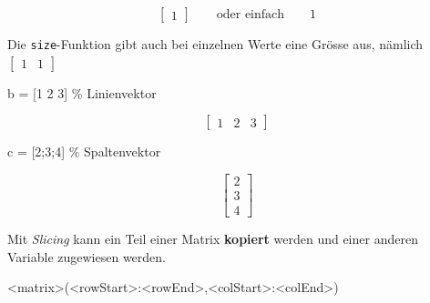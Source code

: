 \documentclass[
  10pt,
  a4paper,
]{article}
\newenvironment{Shaded}{}{}
\newcommand{\CommentTok}[1]{\textcolor[rgb]{0.42,0.45,0.49}{#1}}
\newcommand{\FloatTok}[1]{\textcolor[rgb]{0.00,0.36,0.77}{#1}}
\newcommand{\NormalTok}[1]{\textcolor[rgb]{0.14,0.16,0.18}{#1}}
\newcommand{\OperatorTok}[1]{\textcolor[rgb]{0.14,0.16,0.18}{#1}}
\newcommand{\VariableTok}[1]{\textcolor[rgb]{0.89,0.38,0.04}{#1}}
\numberwithin{equation}{section}
\begin{document}
\begin{multicols}{2}
\[
\begin{bmatrix}
1
\end{bmatrix}\qquad \text{oder einfach}\qquad 1 
\]

Die \texttt{size}-Funktion gibt auch bei einzelnen Werte eine Grösse
aus, nämlich \(\begin{bmatrix}1 & 1\end{bmatrix}\)

\begin{Shaded}
\begin{Highlighting}[]
\VariableTok{b} \OperatorTok{=}\NormalTok{ [}\FloatTok{1} \FloatTok{2} \FloatTok{3}\NormalTok{] }\CommentTok{\% Linienvektor}
\end{Highlighting}
\end{Shaded}

\[
\begin{bmatrix}
1 & 2 & 3
\end{bmatrix}
\]

\begin{Shaded}
\begin{Highlighting}[]
\VariableTok{c} \OperatorTok{=}\NormalTok{ [}\FloatTok{2}\OperatorTok{;}\FloatTok{3}\OperatorTok{;}\FloatTok{4}\NormalTok{] }\CommentTok{\% Spaltenvektor}
\end{Highlighting}
\end{Shaded}

\[
\begin{bmatrix}
2 \\ 3 \\ 4
\end{bmatrix}
\]

\begin{tcolorbox}[enhanced jigsaw, coltitle=black, arc=.35mm, breakable, opacityback=0, opacitybacktitle=0.6, rightrule=.15mm, titlerule=0mm, bottomrule=.15mm, leftrule=.75mm, bottomtitle=1mm, colframe=quarto-callout-tip-color-frame, toprule=.15mm, colbacktitle=quarto-callout-tip-color!10!white, toptitle=1mm, title=\textcolor{quarto-callout-tip-color}{\faLightbulb}\hspace{0.5em}{Slicing}, left=2mm, colback=white]

Mit \emph{Slicing} kann ein Teil einer Matrix \textbf{kopiert} werden
und einer anderen Variable zugewiesen werden.

\begin{Shaded}
\begin{Highlighting}[]
\OperatorTok{\textless{}}\VariableTok{matrix}\OperatorTok{\textgreater{}}\NormalTok{(}\OperatorTok{\textless{}}\VariableTok{rowStart}\OperatorTok{\textgreater{}:\textless{}}\VariableTok{rowEnd}\OperatorTok{\textgreater{},\textless{}}\VariableTok{colStart}\OperatorTok{\textgreater{}:\textless{}}\VariableTok{colEnd}\OperatorTok{\textgreater{}}\NormalTok{)}
\end{Highlighting}
\end{Shaded}


\end{tcolorbox}
\end{multicols}
\end{document}
